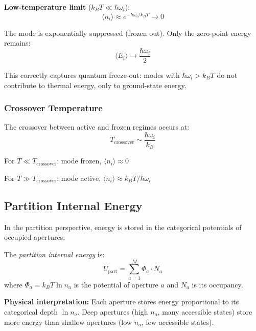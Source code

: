 \textbf{Low-temperature limit} ($k_B T \ll \hbar\omega_i$):
\begin{equation}
\langle n_i \rangle \approx e^{-\hbar\omega_i/k_B T} \to 0
\end{equation}

The mode is exponentially suppressed (frozen out). Only the zero-point energy remains:
\begin{equation}
\langle E_i \rangle \to \frac{\hbar\omega_i}{2}
\end{equation}

This correctly captures quantum freeze-out: modes with $\hbar\omega_i > k_B T$ do not contribute to thermal energy, only to ground-state energy.

\subsubsection{Crossover Temperature}

The crossover between active and frozen regimes occurs at:
\begin{equation}
T_{\text{crossover}} \sim \frac{\hbar\omega_i}{k_B}
\end{equation}

For $T \ll T_{\text{crossover}}$: mode frozen, $\langle n_i \rangle \approx 0$

For $T \gg T_{\text{crossover}}$: mode active, $\langle n_i \rangle \approx k_B T/\hbar\omega_i$

\subsection{Partition Internal Energy}

In the partition perspective, energy is stored in the categorical potentials of occupied apertures:

\begin{definition}
The \textit{partition internal energy} is:
\begin{equation}
\boxed{U_{\text{part}} = \sum_{a=1}^{M} \Phi_a \cdot N_a}
\label{eq:partition_energy}
\end{equation}
where $\Phi_a = k_B T \ln n_a$ is the potential of aperture $a$ and $N_a$ is its occupancy.
\end{definition}

\textbf{Physical interpretation:} Each aperture stores energy proportional to its categorical depth $\ln n_a$. Deep apertures (high $n_a$, many accessible states) store more energy than shallow apertures (low $n_a$, few accessible states).

